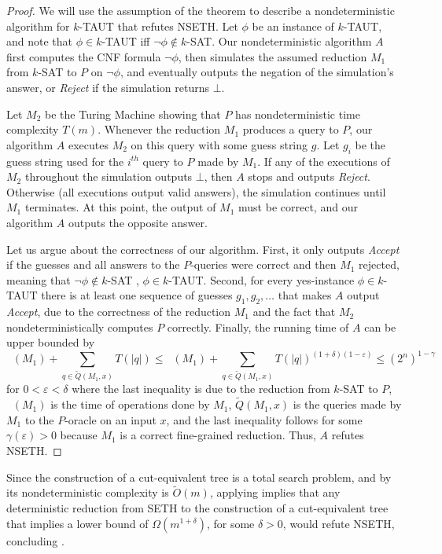 \documentclass{toc}
\theoremstyle{plain}
\newcommand{\SETH}{SETH\xspace}
\newcommand{\NSETH}{NSETH\xspace}
\DeclareMathOperator{\THALT}{\mathsf{T_{HALT}}}
\newcommand\eps{\varepsilon}
\newcommand\tO{\ensuremath{\widetilde O}}  %
\providecommand{\card}[1]{\lvert#1\rvert}
\begin{document}
\begin{proof}
We will use the assumption of the theorem to describe a nondeterministic algorithm for $k$-TAUT that refutes \NSETH.
Let $\phi$ be an instance of $k$-TAUT, and note that $\phi \in k$-TAUT iff $\neg \phi \notin k$-SAT.
Our nondeterministic algorithm $A$ first computes the CNF formula $\neg \phi$, then simulates the assumed reduction $M_1$ from $k$-SAT to $P$ on $\neg \phi$, and eventually outputs the negation of the simulation's answer, or \textsl{Reject} if the simulation returns $\bot$.

Let $M_2$ be the Turing Machine showing that $P$ has nondeterministic time complexity $T(m)$.
Whenever the reduction $M_1$ produces a query to $P$, our algorithm $A$ executes $M_2$ on this query with some guess string $g$. Let $g_i$ be the guess string used for the $i^{th}$ query to $P$ made by $M_1$. If any of the executions of $M_2$ throughout the simulation outputs $\bot$, then $A$ stops and outputs \textsl{Reject}. Otherwise (all executions output valid answers), the simulation continues until $M_1$ terminates. At this point, the output of $M_1$ must be correct, and our algorithm $A$ outputs the opposite answer.

Let us argue about the correctness of our algorithm. First, it only outputs \textsl{Accept} if the guesses and all answers to the $P$-queries were correct and then $M_1$ rejected, meaning that $\neg \phi \notin k$-SAT \ie, $\phi \in k$-TAUT.
Second, for every yes-instance $\phi \in k$-TAUT there is at least one sequence of guesses $g_1,g_2,\ldots$ that makes $A$ output \textsl{Accept}, due to the correctness of the reduction $M_1$ and the fact that $M_2$ nondeterministically computes $P$ correctly.
Finally, the running time of $A$ can be upper bounded by
%
$$
\THALT(M_1) + \sum_{q\in \widetilde{Q}(M_1,x)}T(\card{q}) \leq \THALT(M_1)
+\sum_{q\in \widetilde{Q}(M_1,x)}T(\card{q})^{(1+\delta)(1-\eps)}\leq (2^n)^{1-\gamma}
$$
for $0<\varepsilon<\delta$ where the last inequality is due to the reduction from $k$-SAT to $P$, $\THALT(M_1)$ is the time of operations done by $M_1$,
%
$\widetilde{Q}(M_1,x)$
is the queries made by $M_1$ to the $P$-oracle on an input $x$, and the last inequality follows for some $\gamma(\varepsilon)>0$ because $M_1$ is a correct fine-grained reduction.
Thus, $A$ refutes \NSETH.
\end{proof}

Since the construction of a cut-equivalent tree is a total search problem, and by  its nondeterministic complexity is $\tO(m)$, applying  implies that any deterministic reduction from \SETH to the construction of a cut-equivalent tree that implies a lower bound of $\Omega(m^{1+\delta})$, for some $\delta>0$, would refute \NSETH, concluding .
\end{document}
